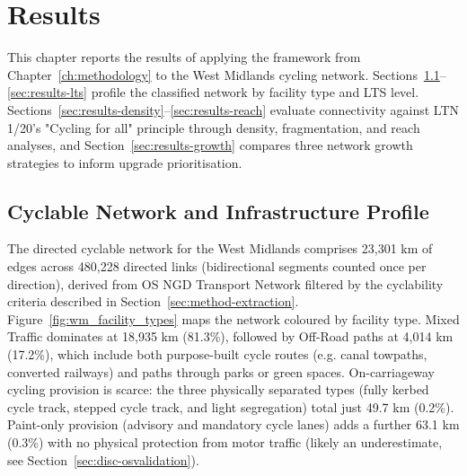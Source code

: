 \chapter{Results}
\label{ch:results}

This chapter reports the results of applying the framework from Chapter~\ref{ch:methodology} to the West Midlands cycling network. Sections~\ref{sec:results-composition}--\ref{sec:results-lts} profile the classified network by facility type and LTS level. Sections~\ref{sec:results-density}--\ref{sec:results-reach} evaluate connectivity against LTN 1/20's "Cycling for all" principle through density, fragmentation, and reach analyses, and Section~\ref{sec:results-growth} compares three network growth strategies to inform upgrade prioritisation.

\section{Cyclable Network and Infrastructure Profile}
\label{sec:results-composition}

The directed cyclable network for the West Midlands comprises 23{,}301 km of edges across 480{,}228 directed links (bidirectional segments counted once per direction), derived from OS NGD Transport Network filtered by the cyclability criteria described in Section~\ref{sec:method-extraction}. Figure~\ref{fig:wm_facility_types} maps the network coloured by facility type. Mixed Traffic dominates at 18{,}935 km (81.3\%), followed by Off-Road paths at 4{,}014 km (17.2\%), which include both purpose-built cycle routes (e.g. canal towpaths, converted railways) and paths through parks or green spaces. On-carriageway cycling provision is scarce: the three physically separated types (fully kerbed cycle track, stepped cycle track, and light segregation) total just 49.7 km (0.2\%). Paint-only provision (advisory and mandatory cycle lanes) adds a further 63.1 km (0.3\%) with no physical protection from motor traffic (likely an underestimate, see Section~\ref{sec:disc-osvalidation}).

